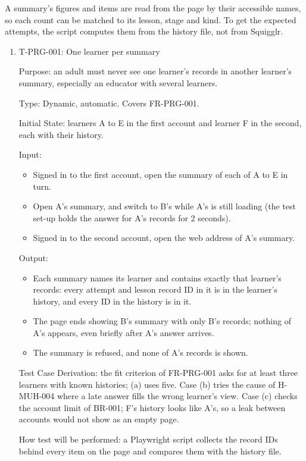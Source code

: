 \documentclass[12pt, titlepage]{article}
\newcommand{\testitem}[1]{\item #1\par\nopagebreak}
\begin{document}
A summary's figures and items are read from the page by their accessible
names, so each count can be matched to its lesson, stage and kind. To get the
expected attempts, the script computes them from the history file, not from
Squigglr.

\begin{enumerate}

\testitem{T-PRG-001: One learner per summary}

Purpose: an adult must never see one learner's records in another learner's
summary, especially an educator with several learners.

Type: Dynamic, automatic. Covers FR-PRG-001.

Initial State: learners A to E in the first account and learner F in the
second, each with their history.

Input:
\begin{itemize}
\item[(a)] Signed in to the first account, open the summary of each of A to
E in turn.
\item[(b)] Open A's summary, and switch to B's while A's is still loading
(the test set-up holds the answer for A's records for 2 seconds).
\item[(c)] Signed in to the second account, open the web address of A's
summary.
\end{itemize}

Output:
\begin{itemize}
\item[(a)] Each summary names its learner and contains exactly that
learner's records: every attempt and lesson record ID in it is in the
learner's history, and every ID in the history is in it.
\item[(b)] The page ends showing B's summary with only B's records; nothing
of A's appears, even briefly after A's answer arrives.
\item[(c)] The summary is refused, and none of A's records is shown.
\end{itemize}

Test Case Derivation: the fit criterion of FR-PRG-001 asks for at least three
learners with known histories; (a) uses five. Case (b) tries the cause of
H-MUH-004 where a late answer fills the wrong learner's view. Case (c)
checks the account limit of BR-001; F's history looks like A's, so a leak
between accounts would not show as an empty page.

How test will be performed: a Playwright script collects the record IDs
behind every item on the page and compares them with the history file.


\end{enumerate}
\end{document}
